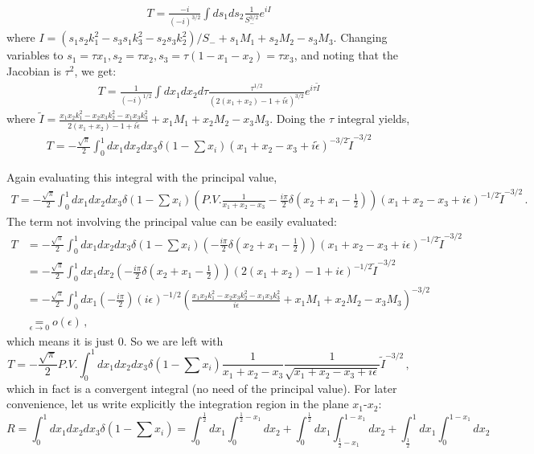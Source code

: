 \documentclass[twoside]{article}
\begin{document}
\begin{align}
  T = \frac{-i}{(-i)^{3/2}}\int ds_1ds_2 \frac{1}{S_-^{3/2}}e^{iI}
\end{align}
where $I = (s_1s_2k^2_1 - s_3s_1k^2_3 - s_2s_3k^2_2)/S_- + s_1M_1 + s_2M_2 - s_3M_3$. Changing variables to $s_1 = \tau x_1, s_2 = \tau x_2, s_3
= \tau (1 - x_1 - x_2) = \tau x_3$, and noting that the Jacobian is $\tau^2$, we get:
\begin{align}
  T = \frac{1}{(-i)^{1/2}}\int dx_1dx_2d\tau \frac{\tau^{1/2}}{\left(2(x_1 + x_2) - 1 + i\tilde{\epsilon}\right)^{3/2}}e^{i\tau
  \tilde{I}}
\end{align}
where $\tilde{I} = \frac{x_1x_2k^2_1 - x_2x_3k^2_2 - x_1x_3k^2_3}{2(x_1 + x_2) - 1 + i\tilde{\epsilon}} + x_1M_1 + x_2M_2 - x_3M_3$. Doing
the $\tau$ integral yields,
\begin{align}
  T = -\frac{\sqrt{\pi}}{2}\int^1_0dx_1dx_2 dx_3\delta(1-\sum x_i)\left( x_1 + x_2 - x_3 + i\tilde{\epsilon} \right)^{-3/2}\tilde{I}^{-3/2}
\end{align}

Again evaluating this integral with the principal value,
\begin{align}
  T = -\frac{\sqrt{\pi}}{2}\int_0^1 dx_1dx_2dx_3\delta(1-\sum x_i)\left( P.V. \frac{1}{x_1 + x_2 - x_3} - \frac{i\pi}{2}\delta(x_2 + x_1 -
  \frac{1}{2}) \right)(x_1 + x_2 - x_3 + i\epsilon)^{-1/2}\tilde{I}^{-3/2}\,.
\end{align}
The term not involving the principal value can be easily evaluated:
\begin{align}
T &= -\frac{\sqrt{\pi}}{2}\int_0^1 dx_1dx_2dx_3\delta(1-\sum x_i)\left( - \frac{i\pi}{2}\delta(x_2 + x_1 -
  \frac{1}{2}) \right)(x_1 + x_2 - x_3 + i\epsilon)^{-1/2}\tilde{I}^{-3/2} \\
&=  -\frac{\sqrt{\pi}}{2}\int_0^1 dx_1dx_2 \left( - \frac{i\pi}{2}\delta(x_2 + x_1 -
  \frac{1}{2}) \right)(2(x_1 + x_2) - 1 + i\epsilon)^{-1/2}\tilde{I}^{-3/2} \\
&= -\frac{\sqrt{\pi}}{2}\int_0^1 dx_1 \left( - \frac{i\pi}{2}\right)(i\epsilon)^{-1/2}(\frac{x_1 x_2 k^2_1 - x_2 x_3 k^2_2 - x_1 x_3 k^2_3}{i \epsilon} + x_1M_1 + x_2M_2 - x_3M_3)^{-3/2} \\
&\underset{\epsilon\to 0}{=} o(\epsilon)\,,
\end{align}
which means it is just 0.
So we are left with
\begin{equation}
  \label{eq:trimxy}
  T = -\frac{\sqrt{\pi}}{2}P.V.\int_0^1 dx_1dx_2dx_3 \delta(1-\sum x_i)\frac{1}{x_1 + x_2 - x_3}\frac{1}{\sqrt{x_1 + x_2 - x_3 + i\epsilon}}
  \tilde{I}^{-3/2}\,,
\end{equation}
which in fact is a convergent integral (no need of the principal value). 
For later convenience, let us write explicitly the integration region in the plane $x_1$-$x_2$:
\begin{equation}
R = \int_0^1 dx_1dx_2dx_3 \delta(1-\sum x_i) = \int_0^{\frac{1}{2}} dx_1 \int_0^{\frac{1}{2}-x_1} dx_2 + \int_0^{\frac{1}{2}} dx_1 \int_{\frac{1}{2}-x_1}^{1-x_1} dx_2 + \int_{\frac{1}{2}}^{1} dx_1 \int_{0}^{1-x_1} dx_2 
\end{equation}
\end{document}
